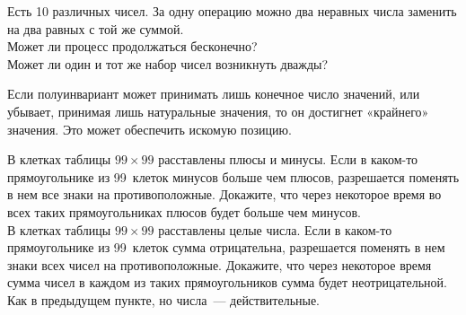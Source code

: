 \begin{problems}

\item
Есть 10 различных чисел.
За одну операцию можно два неравных числа заменить на два равных с той же
суммой.
\\
\subproblem
Может ли процесс продолжаться бесконечно?
\\
\subproblem
Может ли один и тот же набор чисел возникнуть дважды?

\end{problems}

Если полуинвариант может принимать лишь конечное число значений, или убывает,
принимая лишь натуральные значения, то он достигнет «крайнего» значения.
Это может обеспечить искомую позицию.

\begin{problems}

\item
\subproblem
В клетках таблицы $99 \times 99$ расставлены плюсы и минусы.
Если в каком-то прямоугольнике из 99~клеток минусов больше чем плюсов,
разрешается поменять в нем все знаки на противоположные.
Докажите, что через некоторое время во всех таких прямоугольниках плюсов будет
больше чем минусов.
\\
\subproblem
В клетках таблицы $99 \times 99$ расставлены целые числа.
Если в каком-то прямоугольнике из 99~клеток сумма отрицательна, разрешается
поменять в нем знаки всех чисел на противоположные.
Докажите, что через некоторое время сумма чисел в каждом из таких
прямоугольников сумма будет неотрицательной.
\\
\subproblem
Как в предыдущем пункте, но числа~— действительные.

\end{problems}

